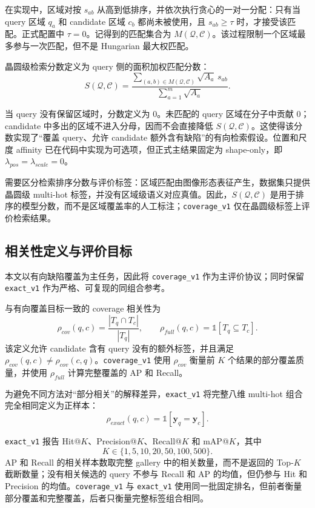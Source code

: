\documentclass[UTF8,a4paper,11pt,fontset=fandol]{ctexart}
\newcommand{\coveragevone}{\texttt{coverage\_v1}}
\newcommand{\exactvone}{\texttt{exact\_v1}}
\begin{document}
在实现中，区域对按 \(s_{ab}\) 从高到低排序，并依次执行贪心的一对一分配：只有当 query 区域 \(q_a\) 和 candidate 区域 \(c_b\) 都尚未被使用，且 \(s_{ab}\geq\tau\) 时，才接受该匹配。正式配置中 \(\tau=0\)。记得到的匹配集合为 \(M(\mathcal Q,\mathcal C)\)。该过程限制一个区域最多参与一次匹配，但不是 Hungarian 最大权匹配。

晶圆级检索分数定义为 query 侧的面积加权匹配分数：
\[
S(\mathcal Q,\mathcal C)=
\frac{\displaystyle\sum_{(a,b)\in M(\mathcal Q,\mathcal C)}
\sqrt{A_a}\,s_{ab}}
{\displaystyle\sum_{a=1}^{m}\sqrt{A_a}}.
\]

当 query 没有保留区域时，分数定义为 0。未匹配的 query 区域在分子中贡献 0；candidate 中多出的区域不进入分母，因而不会直接降低 \(S(\mathcal Q,\mathcal C)\)。这使得该分数实现了“覆盖 query、允许 candidate 额外含有缺陷”的有向检索假设。位置和尺度 affinity 已在代码中实现为可选项，但正式主结果固定为 shape-only，即 \(\lambda_{pos}=\lambda_{scale}=0\)。

需要区分检索排序分数与评价标签：区域匹配由图像形态表征产生，数据集只提供晶圆级 multi-hot 标签，并没有区域级语义对应真值。因此，\(S(\mathcal Q,\mathcal C)\) 是用于排序的模型分数，而不是区域覆盖率的人工标注；\coveragevone{} 仅在晶圆级标签上评价检索结果。

\subsection{相关性定义与评价目标}

本文以有向缺陷覆盖为主任务，因此将 \coveragevone{} 作为主评价协议；同时保留 \exactvone{} 作为严格、可复现的同组合参考。

与有向覆盖目标一致的 coverage 相关性为
\[
\rho_{cov}(q,c)=\frac{|T_q\cap T_c|}{|T_q|},\qquad
\rho_{full}(q,c)=\mathbb{1}[T_q\subseteq T_c].
\]
该定义允许 candidate 含有 query 没有的额外标签，并且满足
\(\rho_{cov}(q,c)\neq\rho_{cov}(c,q)\)。\coveragevone{} 使用 \(\rho_{cov}\) 衡量前 \(K\) 个结果的部分覆盖质量，并使用 \(\rho_{full}\) 计算完整覆盖的 AP 和 Recall。

为避免不同方法对“部分相关”的解释差异，\exactvone{} 将完整八维 multi-hot 组合完全相同定义为正样本：
\[
\rho_{exact}(q,c)=\mathbb{1}[\mathbf y_q=\mathbf y_c].
\]

\exactvone{} 报告 Hit@\({K}\)、Precision@\({K}\)、Recall@\({K}\) 和 mAP@\({K}\)，其中
\[
K\in\{1,5,10,20,50,100,500\}.
\]
AP 和 Recall 的相关样本数取完整 gallery 中的相关数量，而不是返回的 Top-\(K\) 截断数量；没有相关候选的 query 不参与 Recall 和 AP 的均值，但仍参与 Hit 和 Precision 的均值。\coveragevone{} 与 \exactvone{} 使用同一批固定排名，但前者衡量部分覆盖和完整覆盖，后者只衡量完整标签组合相同。
\end{document}
